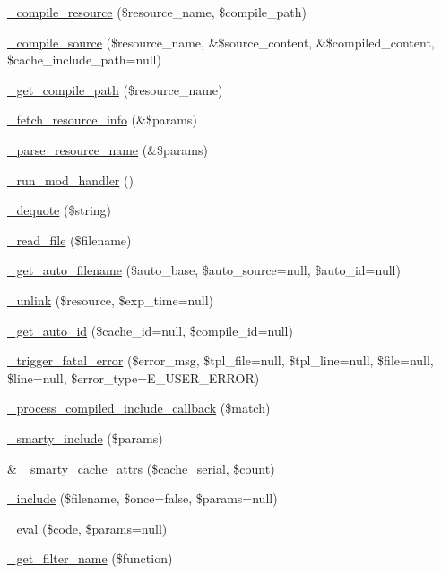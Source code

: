 \begin{DoxyCompactItemize}
\mbox{\hyperlink{class_smarty_a920b3e80a2cc5713250fbb7dec5f23fc}{\+\_\+compile\+\_\+resource}} (\$resource\+\_\+name, \$compile\+\_\+path)
\item 
\mbox{\hyperlink{class_smarty_a85d46cb26200394af2a815fbcc0531eb}{\+\_\+compile\+\_\+source}} (\$resource\+\_\+name, \&\$source\+\_\+content, \&\$compiled\+\_\+content, \$cache\+\_\+include\+\_\+path=null)
\item 
\mbox{\hyperlink{class_smarty_a3a54fc13f42eb7d6363d32bbf783cc1a}{\+\_\+get\+\_\+compile\+\_\+path}} (\$resource\+\_\+name)
\item 
\mbox{\hyperlink{class_smarty_a78b2d264495ae2959a8e67e86bab9e20}{\+\_\+fetch\+\_\+resource\+\_\+info}} (\&\$params)
\item 
\mbox{\hyperlink{class_smarty_ad37ece9f59162066b6b9d592de2f207d}{\+\_\+parse\+\_\+resource\+\_\+name}} (\&\$params)
\item 
\mbox{\hyperlink{class_smarty_ae058bbe121e24a43a4e4b8a51a85e117}{\+\_\+run\+\_\+mod\+\_\+handler}} ()
\item 
\mbox{\hyperlink{class_smarty_a2563e0d1649fe1cd693b9f9ad4ef2f43}{\+\_\+dequote}} (\$string)
\item 
\mbox{\hyperlink{class_smarty_a60429142a4ffd69e86eea341310e2a30}{\+\_\+read\+\_\+file}} (\$filename)
\item 
\mbox{\hyperlink{class_smarty_aba4623a46fe3e54da253ccb89e6cbe12}{\+\_\+get\+\_\+auto\+\_\+filename}} (\$auto\+\_\+base, \$auto\+\_\+source=null, \$auto\+\_\+id=null)
\item 
\mbox{\hyperlink{class_smarty_a40884d76bac2d03fe2e4b88490127684}{\+\_\+unlink}} (\$resource, \$exp\+\_\+time=null)
\item 
\mbox{\hyperlink{class_smarty_ab1a679bb7c98dad1b2d51c41951ada42}{\+\_\+get\+\_\+auto\+\_\+id}} (\$cache\+\_\+id=null, \$compile\+\_\+id=null)
\item 
\mbox{\hyperlink{class_smarty_a2af2bdd132f9c210183775c0bf1c22d9}{\+\_\+trigger\+\_\+fatal\+\_\+error}} (\$error\+\_\+msg, \$tpl\+\_\+file=null, \$tpl\+\_\+line=null, \$file=null, \$line=null, \$error\+\_\+type=E\+\_\+\+U\+S\+E\+R\+\_\+\+E\+R\+R\+OR)
\item 
\mbox{\hyperlink{class_smarty_a4d72ea318875ad16869ec357b3079cdb}{\+\_\+process\+\_\+compiled\+\_\+include\+\_\+callback}} (\$match)
\item 
\mbox{\hyperlink{class_smarty_ac95b8c419b7624569a7bf8fa2ba77f7d}{\+\_\+smarty\+\_\+include}} (\$params)
\item 
\& \mbox{\hyperlink{class_smarty_acc413950cd17c40047c5679f581d5378}{\+\_\+smarty\+\_\+cache\+\_\+attrs}} (\$cache\+\_\+serial, \$count)
\item 
\mbox{\hyperlink{class_smarty_a13f8fe6e3b519a19ba189e21737ac132}{\+\_\+include}} (\$filename, \$once=false, \$params=null)
\item 
\mbox{\hyperlink{class_smarty_ad837e8e78c6f5628cb52f4b69dc1d96c}{\+\_\+eval}} (\$code, \$params=null)
\item 
\mbox{\hyperlink{class_smarty_ace3d50c58e42d8367a550529fea48820}{\+\_\+get\+\_\+filter\+\_\+name}} (\$function)
\end{DoxyCompactItemize}
